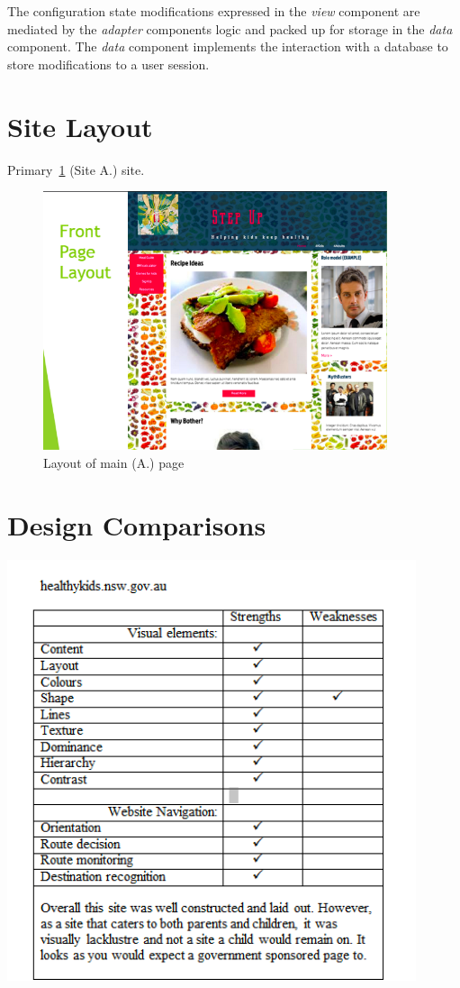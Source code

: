 \documentclass[letterpaper,12pt]{article}
\begin{document}
The configuration state modifications expressed in the \emph{view} component
are mediated by the \emph{adapter} components logic and packed up for storage
in the \emph{data} component. The \emph{data} component implements the
interaction with a database to store modifications to a user session.

\section{Site Layout}

Primary~\cref{fig:layout-mainpage} (Site A.) site.
\begin{figure}[ht!]
  \centering
  \includegraphics[width=0.9\textwidth]{assets/jpg/layout_mainpage}
  \caption{Layout of main (A.) page}
  \label{fig:layout-mainpage}
\end{figure}
\FloatBarrier

\section{Design Comparisons}

\includegraphics[width=0.9\textwidth]{assets/jpg/tab1}
\end{document}

